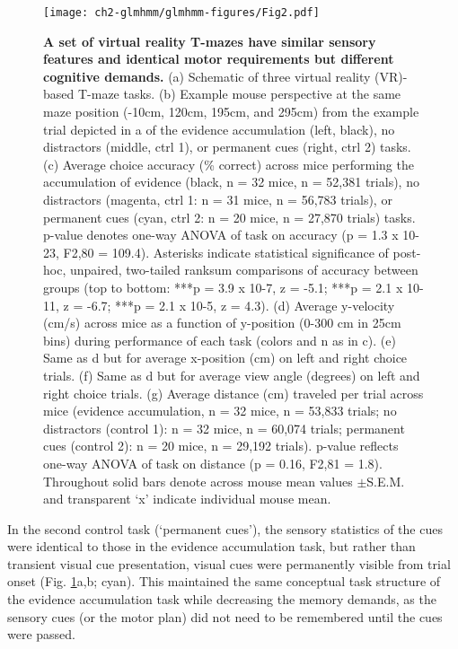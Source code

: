 \begin{figure}[t!]
  \begin{center}
    \texttt{[image: ch2-glmhmm/glmhmm-figures/Fig2.pdf]}
    \caption[A set of virtual reality T-mazes have similar sensory features and identical motor requirements but different cognitive demands]{\textbf{A set of virtual reality T-mazes have similar sensory features and identical motor requirements but different cognitive demands.} (a) Schematic of three virtual reality (VR)-based T-maze tasks. (b) Example mouse perspective  at the same maze position (-10cm, 120cm, 195cm, and 295cm) from the example trial depicted in a of the evidence accumulation (left, black), no distractors (middle, ctrl 1), or permanent cues (right, ctrl 2) tasks. (c) Average choice accuracy (\% correct) across mice performing the accumulation of evidence (black, n = 32 mice, n = 52,381 trials), no distractors (magenta, ctrl 1: n = 31 mice, n = 56,783 trials), or permanent cues (cyan, ctrl 2: n = 20 mice, n = 27,870 trials) tasks. p-value denotes one-way ANOVA of task on accuracy (p = 1.3 x 10-23, F2,80 = 109.4). Asterisks indicate statistical significance of post-hoc, unpaired, two-tailed ranksum comparisons of accuracy between groups (top to bottom: ***p = 3.9 x 10-7, z = -5.1; ***p = 2.1 x 10-11, z = -6.7; ***p = 2.1 x 10-5, z = 4.3). (d) Average y-velocity (cm/s) across mice as a function of y-position (0-300 cm in 25cm bins) during performance of each task (colors and n as in c). (e) Same as d but for average x-position (cm) on left and right choice trials. (f) Same as d but for average view angle (degrees) on left and right choice trials. (g) Average distance (cm) traveled per trial across mice (evidence accumulation, n = 32 mice, n = 53,833 trials; no distractors (control 1): n = 32 mice, n = 60,074 trials; permanent cues (control 2): n = 20 mice, n = 29,192 trials). p-value reflects one-way ANOVA of task on distance (p = 0.16, F2,81 = 1.8). Throughout solid bars denote across mouse mean values $\pm$S.E.M. and transparent ‘x’ indicate individual mouse mean.}
    \label{fig:glmhmm:2}
  \end{center}
  \vspace{-0.5cm}
\end{figure}

In the second control task (‘permanent cues’), the sensory statistics of the cues were identical to those in the evidence accumulation task, but rather than transient visual cue presentation, visual cues were permanently visible from trial onset (Fig. \ref{fig:glmhmm:2}a,b; cyan). This maintained the same conceptual task structure of the evidence accumulation task while decreasing the memory demands, as the sensory cues (or the motor plan) did not need to be remembered until the cues were passed.

